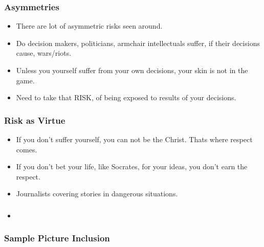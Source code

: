 \begin{frame}[fragile]\frametitle{Asymmetries}

\begin{itemize}
\item There are lot of asymmetric risks seen around.
\item Do decision makers, politicians, armchair intellectuals suffer, if their decisions cause, wars/riots.
\item Unless you yourself suffer from your own decisions, your skin is not in the game.
\item Need to take that RISK, of being exposed to results of your decisions.
\end{itemize}
\end{frame}

\begin{frame}[fragile]\frametitle{Risk as Virtue}

\begin{itemize}
\item If you don't suffer yourself, you can not be the Christ. Thats where respect comes.
\item If you don't bet your life, like Socrates, for your ideas, you don't earn the respect.
\item Journalists covering stories in dangerous situations.
\end{itemize}
\end{frame}










\begin{frame}[fragile]\frametitle{}
\begin{itemize}
\item 
\end{itemize}
\end{frame}

\begin{frame}[fragile]\frametitle{Sample Picture Inclusion}

\end{frame}


